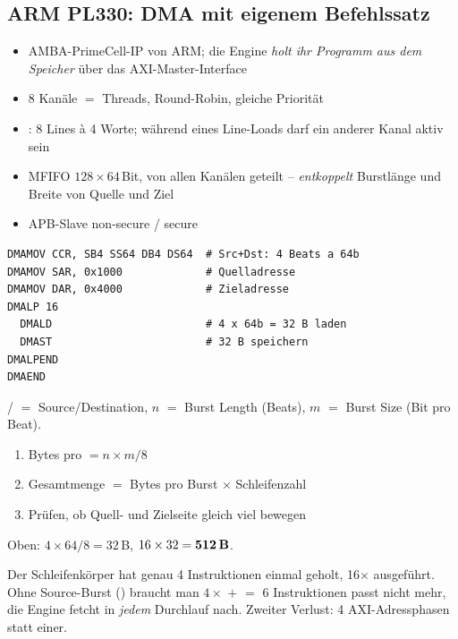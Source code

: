 \subsection{ARM PL330: DMA mit eigenem Befehlssatz}
\begin{itemize}
\item AMBA-PrimeCell-IP von ARM; die Engine \emph{holt ihr Programm aus
      dem Speicher} über das AXI-Master-Interface
\item 8 Kanäle $=$ Threads, Round-Robin, gleiche Priorität
\item {}: 8 Lines à 4 Worte; während eines Line-Loads
      darf ein anderer Kanal aktiv sein
\item MFIFO $128\times64$\,Bit, von allen Kanälen geteilt --
      \emph{entkoppelt} Burstlänge und Breite von Quelle und Ziel
\item APB-Slave non-secure  / secure 
\end{itemize}

\begin{lstlisting}
DMAMOV CCR, SB4 SS64 DB4 DS64  # Src+Dst: 4 Beats a 64b
DMAMOV SAR, 0x1000             # Quelladresse
DMAMOV DAR, 0x4000             # Zieladresse
DMALP 16
  DMALD                        # 4 x 64b = 32 B laden
  DMAST                        # 32 B speichern
DMALPEND
DMAEND
\end{lstlisting}

\begin{rezept}
\label{rez:ccr}
/ $=$ Source/Destination, $n$ $=$ Burst Length (Beats),
$m$ $=$ Burst Size (Bit pro Beat).
\begin{enumerate}
\item Bytes pro  $=n\times m/8$
\item Gesamtmenge $=$ Bytes pro Burst $\times$ Schleifenzahl
\item Prüfen, ob Quell- und Zielseite gleich viel bewegen
\end{enumerate}
Oben: $4\times64/8=32$\,B, $16\times32=\textbf{512\,B}$.
\end{rezept}

\begin{falle}
Der Schleifenkörper hat genau 4 Instruktionen \ra einmal geholt,
16$\times$ ausgeführt. Ohne Source-Burst () braucht man
$4\times$ $+$  $=$ 6 Instruktionen \ra passt nicht mehr,
die Engine fetcht in \emph{jedem} Durchlauf nach. Zweiter Verlust:
4 AXI-Adressphasen statt einer.\\
\end{falle}

